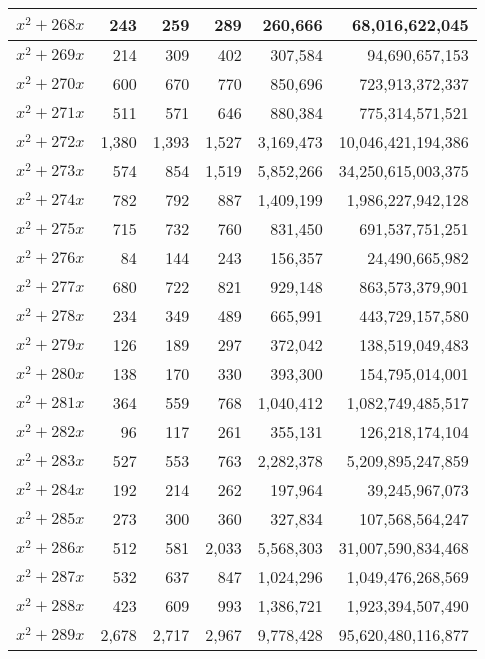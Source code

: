 \documentclass[a4paper]{amsproc}
\theoremstyle{plain}
\begin{document}
\begin{longtable}{ | l | r | r | r | r | r | }
$x^2 + 268x$ & 243 & 259 & 289 & 260{,}666 & 68{,}016{,}622{,}045 \\ \hline
$x^2 + 269x$ & 214 & 309 & 402 & 307{,}584 & 94{,}690{,}657{,}153 \\ \hline
$x^2 + 270x$ & 600 & 670 & 770 & 850{,}696 & 723{,}913{,}372{,}337 \\ \hline
$x^2 + 271x$ & 511 & 571 & 646 & 880{,}384 & 775{,}314{,}571{,}521 \\ \hline
$x^2 + 272x$ & 1{,}380 & 1{,}393 & 1{,}527 & 3{,}169{,}473 & 10{,}046{,}421{,}194{,}386 \\ \hline
$x^2 + 273x$ & 574 & 854 & 1{,}519 & 5{,}852{,}266 & 34{,}250{,}615{,}003{,}375 \\ \hline
$x^2 + 274x$ & 782 & 792 & 887 & 1{,}409{,}199 & 1{,}986{,}227{,}942{,}128 \\ \hline
$x^2 + 275x$ & 715 & 732 & 760 & 831{,}450 & 691{,}537{,}751{,}251 \\ \hline
$x^2 + 276x$ & 84 & 144 & 243 & 156{,}357 & 24{,}490{,}665{,}982 \\ \hline
$x^2 + 277x$ & 680 & 722 & 821 & 929{,}148 & 863{,}573{,}379{,}901 \\ \hline
$x^2 + 278x$ & 234 & 349 & 489 & 665{,}991 & 443{,}729{,}157{,}580 \\ \hline
$x^2 + 279x$ & 126 & 189 & 297 & 372{,}042 & 138{,}519{,}049{,}483 \\ \hline
$x^2 + 280x$ & 138 & 170 & 330 & 393{,}300 & 154{,}795{,}014{,}001 \\ \hline
$x^2 + 281x$ & 364 & 559 & 768 & 1{,}040{,}412 & 1{,}082{,}749{,}485{,}517 \\ \hline
$x^2 + 282x$ & 96 & 117 & 261 & 355{,}131 & 126{,}218{,}174{,}104 \\ \hline
$x^2 + 283x$ & 527 & 553 & 763 & 2{,}282{,}378 & 5{,}209{,}895{,}247{,}859 \\ \hline
$x^2 + 284x$ & 192 & 214 & 262 & 197{,}964 & 39{,}245{,}967{,}073 \\ \hline
$x^2 + 285x$ & 273 & 300 & 360 & 327{,}834 & 107{,}568{,}564{,}247 \\ \hline
$x^2 + 286x$ & 512 & 581 & 2{,}033 & 5{,}568{,}303 & 31{,}007{,}590{,}834{,}468 \\ \hline
$x^2 + 287x$ & 532 & 637 & 847 & 1{,}024{,}296 & 1{,}049{,}476{,}268{,}569 \\ \hline
$x^2 + 288x$ & 423 & 609 & 993 & 1{,}386{,}721 & 1{,}923{,}394{,}507{,}490 \\ \hline
$x^2 + 289x$ & 2{,}678 & 2{,}717 & 2{,}967 & 9{,}778{,}428 & 95{,}620{,}480{,}116{,}877 \\ \hline

\end{longtable}
\end{document}
